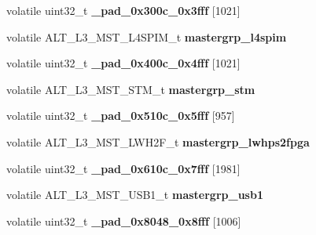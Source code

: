 \begin{DoxyCompactItemize}
\item 
\mbox{\label{structALT__L3__MSTGRP__s_a975b8945d0b5c156f81fff06e0bb4021}} 
volatile uint32\+\_\+t {\bfseries \+\_\+pad\+\_\+0x300c\+\_\+0x3fff} \mbox{[}1021\mbox{]}
\item 
\mbox{\label{structALT__L3__MSTGRP__s_a3bbf387c45a9b68dd3a7eda9983e4302}} 
volatile A\+L\+T\+\_\+\+L3\+\_\+\+M\+S\+T\+\_\+\+L4\+S\+P\+I\+M\+\_\+t {\bfseries mastergrp\+\_\+l4spim}
\item 
\mbox{\label{structALT__L3__MSTGRP__s_a6d3cdb26ec0fabf8447bb1d919d56126}} 
volatile uint32\+\_\+t {\bfseries \+\_\+pad\+\_\+0x400c\+\_\+0x4fff} \mbox{[}1021\mbox{]}
\item 
\mbox{\label{structALT__L3__MSTGRP__s_ad4ea4d7f91b1215388bc486edc4a10cd}} 
volatile A\+L\+T\+\_\+\+L3\+\_\+\+M\+S\+T\+\_\+\+S\+T\+M\+\_\+t {\bfseries mastergrp\+\_\+stm}
\item 
\mbox{\label{structALT__L3__MSTGRP__s_aef46f96fd90a49a70aa9509fa8cc3f92}} 
volatile uint32\+\_\+t {\bfseries \+\_\+pad\+\_\+0x510c\+\_\+0x5fff} \mbox{[}957\mbox{]}
\item 
\mbox{\label{structALT__L3__MSTGRP__s_aee023c658d64209dfc52d43cbeeeb299}} 
volatile A\+L\+T\+\_\+\+L3\+\_\+\+M\+S\+T\+\_\+\+L\+W\+H2\+F\+\_\+t {\bfseries mastergrp\+\_\+lwhps2fpga}
\item 
\mbox{\label{structALT__L3__MSTGRP__s_ac0f9b56b413f759ea2240dce1762d226}} 
volatile uint32\+\_\+t {\bfseries \+\_\+pad\+\_\+0x610c\+\_\+0x7fff} \mbox{[}1981\mbox{]}
\item 
\mbox{\label{structALT__L3__MSTGRP__s_a503a2397d394aa02f7eff0a0770ecaed}} 
volatile A\+L\+T\+\_\+\+L3\+\_\+\+M\+S\+T\+\_\+\+U\+S\+B1\+\_\+t {\bfseries mastergrp\+\_\+usb1}
\item 
\mbox{\label{structALT__L3__MSTGRP__s_a66382219593e7b95cb97728df77adf6d}} 
volatile uint32\+\_\+t {\bfseries \+\_\+pad\+\_\+0x8048\+\_\+0x8fff} \mbox{[}1006\mbox{]}
\item 

\end{DoxyCompactItemize}
